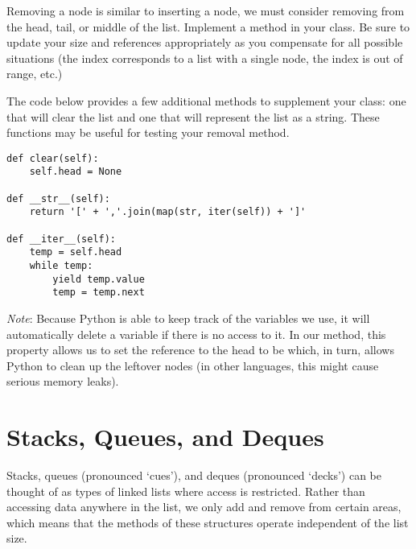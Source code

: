 \begin{problem}
Removing a node is similar to inserting a node, we must consider removing from the head, tail, or middle of the list.
Implement a  method in your  class.
Be sure to update your size and references appropriately as you compensate for all possible situations (the index corresponds to a list with a single node, the index is out of range, etc.)

The code below provides a few additional methods to supplement your  class: one that will clear the list and one that will represent the list as a string.
These functions may be useful for testing your removal method.
\begin{lstlisting}
def clear(self):
    self.head = None

def __str__(self):
    return '[' + ','.join(map(str, iter(self)) + ']'

def __iter__(self):
    temp = self.head
    while temp:
        yield temp.value
        temp = temp.next
\end{lstlisting}
\emph{Note}: Because Python is able to keep track of the variables we use, it will automatically delete a variable if there is no access to it.
In our  method, this property allows us to set the reference to the head to be  which, in turn, allows Python to clean up the leftover nodes (in other languages, this might cause serious memory leaks).
\label{prob:LinkedList}
\end{problem}

\section*{Stacks, Queues, and Deques}
Stacks, queues (pronounced `cues'), and deques (pronounced `decks') can be thought of as types of linked lists where access is restricted.
Rather than accessing data anywhere in the list, we only add and remove from certain areas, which means that the methods of these structures operate independent of the list size.

